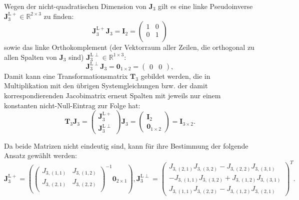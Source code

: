 Wegen der nicht-quadratischen Dimension von $\mathbf{J}_3$ gilt es eine linke Pseudoinverse $\mathbf{J}_3^{\mathrm{L}+} \in \mathbb{R}^{2 \times 3}$ zu finden:
\begin{equation}
	\mathbf{J}_3^{\mathrm{L}+} \mathbf{J}_3 = \mathbf{I}_{2} = 
	\left(\begin{matrix}
	1 & 0\\
	0 & 1\\
	\end{matrix}\right)	
\end{equation}
sowie das linke Orthokomplement (der Vektorraum aller Zeilen, die orthogonal zu allen Spalten von $\mathbf{J}_3$ sind) $\mathbf{J}_3^{\mathrm{L}\perp} \in \mathbb{R}^{1 \times 3}$:
\begin{equation}
	\mathbf{J}_3^{\mathrm{L}\perp} \mathbf{J}_3 = \mathbf{0}_{1 \times 2} = 
	\left(\begin{matrix}
	0 & 0
	\end{matrix}\right),
\end{equation}
Damit kann eine Transformationsmatrix $\mathbf{T}_3$ gebildet werden, die in Multiplikation mit den übrigen Systemgleichungen bzw. der damit korrespondierenden Jacobimatrix erneut Spalten mit jeweils nur einem konstanten nicht-Null-Eintrag zur Folge hat:
\begin{equation}
	\mathbf{T}_3 \mathbf{J}_3 =
	\left(\begin{matrix}
		\mathbf{J}_3^{\mathrm{L}+} \\
		\mathbf{J}_3^{\mathrm{L} \perp}
	\end{matrix}\right)
	\mathbf{J}_3 =
	\left(\begin{matrix}
		\mathbf{I}_{2} \\
		\mathbf{0}_{1 \times 2}
	\end{matrix}\right)
	=
	\mathbf{I}_{3 \times 2}. 
\end{equation}

Da beide Matrizen nicht eindeutig sind, kann für ihre Bestimmung der folgende Ansatz gewählt werden: 
\begin{equation}
	\mathbf{J}_3^{\mathrm{L}+} =
	\left(
	\left(\begin{matrix}
		J_{3, (1,1)} & J_{3, (1,2)}\\
		J_{3, (2,1)} & J_{3, (2,2)}\\
	\end{matrix}\right)^{-1}	
	\mathbf{0}_{2 \times 1}
	\right), 		
	\mathbf{J}_3^{\mathrm{L}\perp} =
	\left(\begin{matrix}
		J_{3, (2,1)} J_{3, (3,2)} - J_{3, (2,2)} J_{3, (3,1)} \\
		-J_{3, (1,1)} J_{3, (3,2)} + J_{3, (1,2)} J_{3, (3,1)} \\
		J_{3, (1,1)} J_{3, (2,2)} - J_{3, (1,2)} J_{3, (2,1)}
	\end{matrix}\right)^T.
\end{equation}

